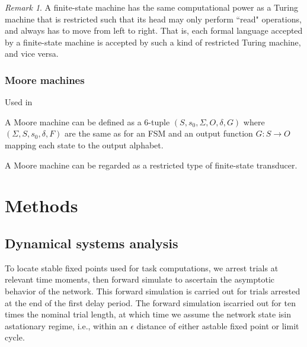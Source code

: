 \documentclass{scrartcl}
\theoremstyle{definition}
\theoremstyle{remark}
\newtheorem{remark}{Remark}
\begin{document}
\begin{remark}
A finite-state machine has the same computational power as a Turing machine that is restricted such that its head may only perform ``read" operations, and always has to move from left to right.
 That is, each formal language accepted by a finite-state machine is accepted by such a kind of restricted Turing machine, and vice versa.
\end{remark}


\subsubsection{Moore machines}%

Used in \citep{tino2006learning}

A Moore machine can be defined as a 6-tuple  $(S,s_{0},\Sigma ,O,\delta ,G)$ where $(\Sigma ,S,s_{0},\delta ,F)$ are the same as for an FSM and 
an output function $G:S\rightarrow O$ mapping each state to the output alphabet.



A Moore machine can be regarded as a restricted type of finite-state transducer.



\section{Methods}

\subsection{Dynamical systems analysis}
To locate stable fixed points used for task computations, we arrest trials at relevant time moments, then forward simulate to ascertain the asymptotic behavior of the network. This forward simulation is carried out for trials arrested at the end of the first delay period. The forward simulation iscarried out for ten times the nominal trial length, at which time we assume the network state isin astationary regime, i.e., within an $\epsilon$ distance of either astable fixed point or limit cycle.


\end{document}
